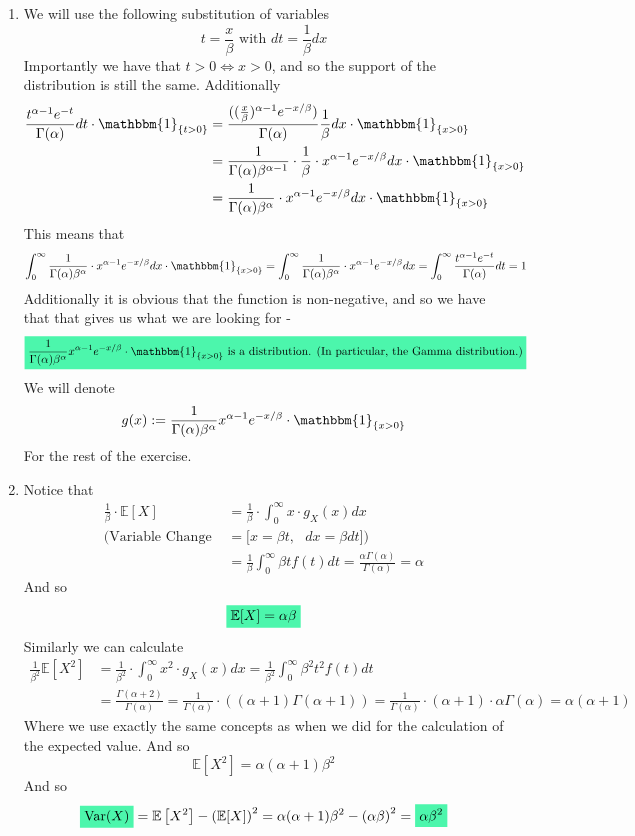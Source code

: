 \documentclass[../main.tex]{subfiles}
\begin{document}
\begin{enumerate}
\item We will use the following substitution of variables 
\[t=\frac{x}{\beta}\text{ with } dt=\frac{1}{\beta}dx\]
Importantly we have that $t>0\Leftrightarrow x>0$, and so the support of the distribution is still the same. Additionally
\begin{align*}
    \frac{t^{\alpha-1}e^{-t}}{\Gamma(\alpha)}dt \cdot\mathbbm{1}_{\{t>0\}}&= \frac{((\frac{x}{\beta})^{\alpha-1}e^{-x/\beta})}{\Gamma(\alpha)}\frac{1}{\beta}dx \cdot\mathbbm{1}_{\{x>0\}}\\
    &= \frac{1}{\Gamma(\alpha)\beta^{\alpha-1}}\cdot\frac{1}{\beta}\cdot x^{\alpha-1}e^{-x/\beta} dx\cdot\mathbbm{1}_{\{x>0\}} \\
    &= \frac{1}{\Gamma(\alpha)\beta^{\alpha}}\cdot x^{\alpha-1}e^{-x/\beta} dx\cdot\mathbbm{1}_{\{x>0\}}
\end{align*}
This means that
\[\int_0^\infty \frac{1}{\Gamma(\alpha)\beta^{\alpha}}\cdot x^{\alpha-1}e^{-x/\beta} dx\cdot\mathbbm{1}_{\{x>0\}} = \int_0^\infty \frac{1}{\Gamma(\alpha)\beta^{\alpha}}\cdot x^{\alpha-1}e^{-x/\beta} dx = \int_0^\infty \frac{t^{\alpha-1}e^{-t}}{\Gamma(\alpha)}dt = 1\]
Additionally it is obvious that the function is non-negative, and so we have that 
that gives us what we are looking for - 
\[\mathcolorbox{goodcolor}{\frac{1}{\Gamma(\alpha)\beta^{\alpha}}x^{\alpha-1}e^{-x/\beta}\cdot\mathbbm{1}_{\{x>0\}}\text{ is a distribution. (In particular, the Gamma distribution.)}}\]
We will denote 
\[g(x):=\frac{1}{\Gamma(\alpha)\beta^{\alpha}}x^{\alpha-1}e^{-x/\beta}\cdot\mathbbm{1}_{\{x>0\}}\]
For the rest of the exercise. \qedsymbol
\item Notice that
\begin{align*}
    \frac{1}{\beta}\cdot\mathbb{E}[X] &= \frac{1}{\beta}\cdot\int_0^{\infty} x\cdot g_X(x) dx \\
    (\text{Variable Change }&=\textbf{[}x=\beta t, \text{    }dx=\beta dt\textbf{]}) \\ &= \frac{1}{\beta}\int_0^\infty\beta t f(t) dt =\frac{\alpha\Gamma(\alpha)}{\Gamma(\alpha)}=\alpha
\end{align*}
And so 
\[\mathcolorbox{goodcolor}{\mathbb{E}[X] = \alpha\beta}\]
Similarly we can calculate
\begin{align*}
    \frac{1}{\beta^2}\mathbb{E}[X^2] &= \frac{1}{\beta^2}\cdot\int_0^{\infty} x^2\cdot g_X(x) dx = \frac{1}{\beta^2}\int_0^{\infty} \beta^2 t^2 f(t)dt \\ &= \frac{\Gamma(\alpha+2)}{\Gamma(\alpha)} = \frac{1}{\Gamma(\alpha)}\cdot\left((\alpha+1)\Gamma(\alpha+1)\right) = \frac{1}{\Gamma(\alpha)}\cdot (\alpha+1)\cdot \alpha\Gamma(\alpha) = \alpha(\alpha+1)
\end{align*} 
Where we use exactly the same concepts as when we did for the calculation of the expected value. And so 
\[\mathbb{E}[X^2] = \alpha(\alpha+1)\beta^2\]
And so 
\[\mathcolorbox{goodcolor}{\text{Var}(X)} = \mathbb{E}\left[X^2\right]-\left(\mathbb{E}[X]\right)^2
= \alpha(\alpha+1)\beta^2 - \left(\alpha\beta\right)^2
= \mathcolorbox{goodcolor}{\alpha\beta^2}\]
\qedsymbol


\end{enumerate}
\end{document}
